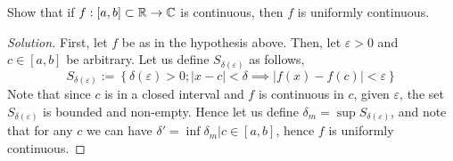 \begin{example}
  Show that if $f:[a,b]\subset\mathbb R \to\mathbb C$ is continuous, then $f$ is uniformly continuous.
\end{example}
\begin{proof}[Solution]
  First, let $f$ be as in the hypothesis above. Then, let $\varepsilon>0$ and $c\in [a,b]$
  be arbitrary.  Let us define $S_{\delta(\varepsilon)}$ as follows, 
  \[S_{\delta(\varepsilon)} := \left\{
  \delta(\varepsilon)>0 ; |x-c|<\delta \implies |f(x)-f(c)|<\varepsilon\right\}\]
  Note that since $c$ is in a closed interval and $f$ is continuous in $c$, given
  $\varepsilon$, the set $S_{\delta (\varepsilon)}$ is bounded and non-empty. Hence let us
  define $\delta_m=\sup{S_{\delta(\varepsilon)}}$, and note that for any $c$ we can have
  $\delta'=\inf \delta_m |c\in[a,b]$, hence $f$ is uniformly continuous.
\end{proof}
